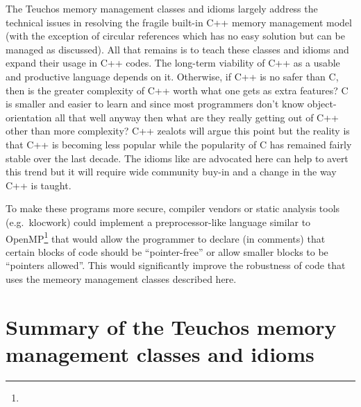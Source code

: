 \documentclass[pdf,ps2pdf,11pt]{SANDreport}
\begin{document}
The Teuchos memory management classes and idioms largely address the
technical issues in resolving the fragile built-in C++ memory
management model (with the exception of circular references which has
no easy solution but can be managed as discussed).  All that remains
is to teach these classes and idioms and expand their usage in C++
codes.  The long-term viability of C++ as a usable and productive
language depends on it.  Otherwise, if C++ is no safer than C, then is
the greater complexity of C++ worth what one gets as extra features?
C is smaller and easier to learn and since most programmers don't know
object-orientation all that well anyway then what are they really
getting out of C++ other than more complexity?  C++ zealots will argue
this point but the reality is that C++ is becoming less popular while
the popularity of C has remained fairly stable over the last decade.
The idioms like are advocated here can help to avert this trend but it
will require wide community buy-in and a change in the way C++ is
taught.

To make these programs more secure, compiler vendors or static
analysis tools (e.g.\ klocwork) could implement a preprocessor-like
language similar to OpenMP\footnote{{}} that
would allow the programmer to declare (in comments) that certain
blocks of code should be ``pointer-free'' or allow smaller blocks to
be ``pointers allowed''.  This would significantly improve the
robustness of code that uses the memeory management classes described
here.



%

\clearpage
\providecommand*{\phantomsection}{}
\phantomsection
{}



%
\appendix


%
{}\section{Summary of the Teuchos memory management classes and
idioms}
\label{apdx:summary_of_idioms}
%
\end{document}
